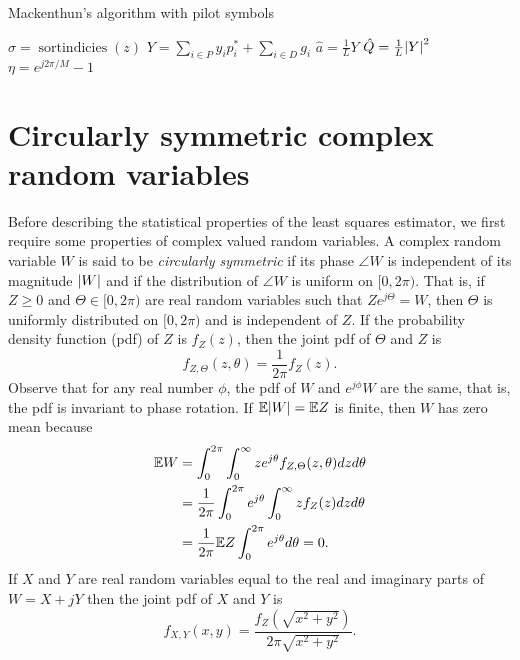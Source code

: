 \documentclass[journal]{IEEEtran}
\begin{document}
\begin{algorithm}[t] \label{alg:loglinear}
\SetAlCapFnt{\small}
\SetAlTitleFnt{}
\caption{Mackenthun's algorithm with pilot symbols}
\DontPrintSemicolon
{}
$\sigma = \operatorname{sortindicies}(z)$  \;
$Y = \sum_{i \in P} y_i p_i^* + \sum_{i \in D} g_i $ \;
$\hat{a} = \frac{1}{L} Y$  \;
$\hat{Q} = \frac{1}{L}{\left\vert Y \right\vert}^2$  \;
$\eta = e^{j2\pi/M} - 1$ \;
\end{algorithm}


\section{Circularly symmetric complex random variables}\label{sec:circ-symm-compl}

Before describing the statistical properties of the least squares estimator, we first require some properties of complex valued random variables.  A complex random variable $W$ is said to be \emph{circularly symmetric} if its phase $\angle{W}$ is independent of its magnitude ${\left\vert W \right\vert}$ and if the distribution of $\angle{W}$ is uniform on $[0,2\pi)$.  That is, if $Z \geq 0$ and $\Theta \in [0,2\pi)$ are real random variables such that $Ze^{j\Theta} = W$, then $\Theta$ is uniformly distributed on $[0,2\pi)$ and is independent of $Z$.  If the probability density function (pdf) of $Z$ is $f_Z(z)$, then the joint pdf of $\Theta$ and $Z$ is 
\[
f_{Z,\Theta}(z,\theta) = \frac{1}{2\pi}f_Z(z).
\]
Observe that for any real number $\phi$, the pdf of $W$ and $e^{j\phi}W$ are the same, that is, the pdf is invariant to phase rotation.  If ${\mathbb E}{\left\vert W \right\vert} = {\mathbb E} Z$ is finite, then $W$ has zero mean because
\begin{align*}
 {\mathbb E} W &= \int_{0}^{2\pi} \int_{0}^\infty z e^{j\theta} f_{Z,\Theta}(z,\theta) dz d\theta \\
 &= \frac{1}{2\pi} \int_{0}^{2\pi} e^{j\theta} \int_{0}^\infty z f_Z(z) dz d\theta \\
 &= \frac{1}{2\pi}{\mathbb E} Z \int_{0}^{2\pi} e^{j\theta} d\theta = 0.
 \end{align*}
If $X$ and $Y$ are real random variables equal to the real and imaginary parts of $W = X + jY$ then the joint pdf of $X$ and $Y$ is
\[
f_{X,Y}(x,y) = \frac{f_Z(\sqrt{x^2 + y^2})}{2\pi \sqrt{x^2 + y^2}}.
\]
\end{document}
